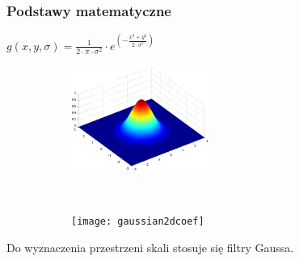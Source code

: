 \begin{frame}
	\frametitle{Podstawy matematyczne}
	
	\begin{center}
		$ g(x,y,\sigma)= \frac{1}{2 \cdot \pi \cdot \sigma ^ {2} }\cdot e^{(-\frac{x^{2} + y^{2}}{2 \cdot \sigma ^{2}})} $

	\begin{figure}[h]
		\begin{center}
			\begin{subfigure}[b]{4.5cm}
				\centering
				\includegraphics[width=4.5cm]{gaussian2d.png}
			\end{subfigure}
			~
			\begin{subfigure}[b]{4.5cm}
				\centering
				\texttt{[image: gaussian2dcoef]}
			\end{subfigure}
		\end{center}
	\end{figure}
		
	\end{center}
	
	Do wyznaczenia przestrzeni skali stosuje się filtry Gaussa. 
	
	
\end{frame}
